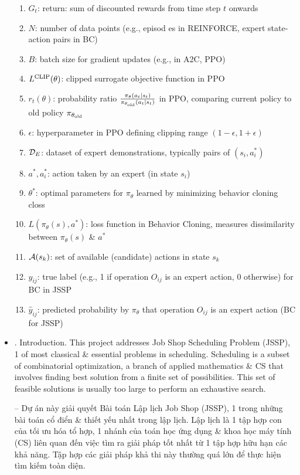 \documentclass{article}
\begin{document}
\begin{itemize}
\begin{enumerate}
        \item $G_t$: return: sum of discounted rewards from time step $t$ onwards
        \item $N$: number of data points (e.g., episod
        es in REINFORCE, expert state-action pairs in BC)
        \item $B$: batch size for gradient updates (e.g., in A2C, PPO)
        \item $L^{\rm CLIP}(\theta)$: clipped surrogate objective function in PPO
        \item $r_t(\theta)$: probability ratio $\frac{\pi_\theta(a_t|s_t)}{\pi_{\theta_{\rm old}}(a_t|s_t)}$ in PPO, comparing current policy to old policy $\pi_{\theta_{\rm old}}$
        \item $\epsilon$: hyperparameter in PPO defining clipping range $(1 - \epsilon,1 + \epsilon)$
        \item ${\cal D}_E$: dataset of expert demonstrations, typically pairs of $(s_i,a_i^*)$
        \item $a^*,a_i^*$: action taken by an expert (in state $s_i$)
        \item $\theta^*$: optimal parameters for $\pi_\theta$ learned by minimizing behavior cloning closs
        \item $L(\pi_\theta(s),a^*)$: loss function in Behavior Cloning, measures dissimilarity between $\pi_\theta(s)$ \& $a^*$
        \item ${\cal A}(s_k)$: set of available (candidate) actions in state $s_k$
        \item $y_{ij}$: true label (e.g., 1 if operation $O_{ij}$ is an expert action, 0 otherwise) for BC in JSSP
        \item $\hat{y}_{ij}$: predicted probability by $\pi_\theta$ that operation $O_{ij}$ is an expert action (BC for JSSP)
    \end{enumerate}
    \item {. Introduction.} This project addresses Job Shop Scheduling Problem (JSSP), 1 of most classical \& essential problems in scheduling. Scheduling is a subset of combinatorial optimization, a branch of applied mathematics \& CS that involves finding best solution from a finite set of possibilities. This set of feasible solutions is usually too large to perform an exhaustive search.

    -- Dự án này giải quyết Bài toán Lập lịch Job Shop (JSSP), 1 trong những bài toán cổ điển \& thiết yếu nhất trong lập lịch. Lập lịch là 1 tập hợp con của tối ưu hóa tổ hợp, 1 nhánh của toán học ứng dụng \& khoa học máy tính (CS) liên quan đến việc tìm ra giải pháp tốt nhất từ 1 tập hợp hữu hạn các khả năng. Tập hợp các giải pháp khả thi này thường quá lớn để thực hiện tìm kiếm toàn diện.


\end{itemize}
\end{document}
